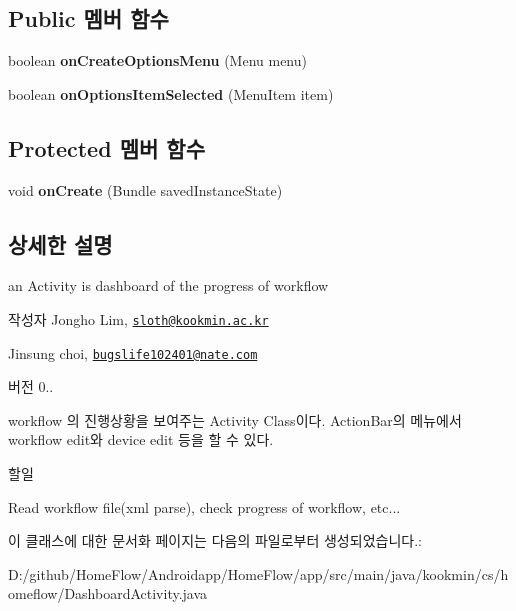 \subsection*{Public 멤버 함수}
\begin{DoxyCompactItemize}
\item 
\hypertarget{classkookmin_1_1cs_1_1homeflow_1_1_dashboard_activity_a0029ef83ec04c88b44dd06af1ba33552}{}boolean {\bfseries on\+Create\+Options\+Menu} (Menu menu)\label{classkookmin_1_1cs_1_1homeflow_1_1_dashboard_activity_a0029ef83ec04c88b44dd06af1ba33552}

\item 
\hypertarget{classkookmin_1_1cs_1_1homeflow_1_1_dashboard_activity_a344c2d053fb5af992768b4cac477899b}{}boolean {\bfseries on\+Options\+Item\+Selected} (Menu\+Item item)\label{classkookmin_1_1cs_1_1homeflow_1_1_dashboard_activity_a344c2d053fb5af992768b4cac477899b}

\end{DoxyCompactItemize}
\subsection*{Protected 멤버 함수}
\begin{DoxyCompactItemize}
\item 
\hypertarget{classkookmin_1_1cs_1_1homeflow_1_1_dashboard_activity_a4906b7049b563651534d0b9996e8788d}{}void {\bfseries on\+Create} (Bundle saved\+Instance\+State)\label{classkookmin_1_1cs_1_1homeflow_1_1_dashboard_activity_a4906b7049b563651534d0b9996e8788d}

\end{DoxyCompactItemize}


\subsection{상세한 설명}
an Activity is dashboard of the progress of workflow 

\begin{DoxyAuthor}{작성자}
Jongho Lim, \href{mailto:sloth@kookmin.ac.kr}{\tt sloth@kookmin.\+ac.\+kr} 

Jinsung choi, \href{mailto:bugslife102401@nate.com}{\tt bugslife102401@nate.\+com} 
\end{DoxyAuthor}
\begin{DoxyVersion}{버전}
0..
\end{DoxyVersion}
workflow 의 진행상황을 보여주는 Activity Class이다. Action\+Bar의 메뉴에서 workflow edit와 device edit 등을 할 수 있다. \begin{DoxyRefDesc}{할일}
\item[\hyperlink{todo__todo000001}{할일}]Read workflow file(xml parse), check progress of workflow, etc... \end{DoxyRefDesc}


이 클래스에 대한 문서화 페이지는 다음의 파일로부터 생성되었습니다.\+:\begin{DoxyCompactItemize}
\item 
D\+:/github/\+Home\+Flow/\+Androidapp/\+Home\+Flow/app/src/main/java/kookmin/cs/homeflow/Dashboard\+Activity.\+java\end{DoxyCompactItemize}
